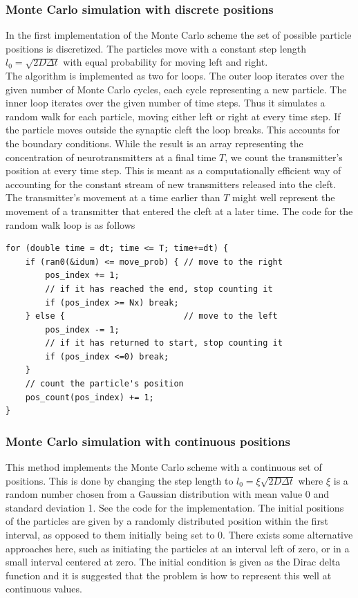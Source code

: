\documentclass[12pt]{article}
\begin{document}
\begin{flushleft}
\subsubsection{Monte Carlo simulation with discrete positions}
In the first implementation of the Monte Carlo scheme the set of possible
particle positions is discretized. The particles move with a
constant step length
$l_0 = \sqrt{2D\Delta t}$ with equal probability for moving left and right.\\
\vspace{5mm}
The algorithm is implemented as two for loops. The outer loop iterates over
the given number of Monte Carlo cycles, each cycle representing a new particle.
The inner loop iterates over the given number of time steps. Thus it simulates
a random walk for each particle, moving either left or right at every time step.
If the particle moves outside the synaptic cleft the loop breaks. This accounts
for the boundary conditions.
While the result is an array representing the concentration of neurotransmitters
at a final time $T$, we count the transmitter's position at every time step.
This is meant as a computationally efficient way of accounting for the constant
stream of new transmitters released into the cleft. The transmitter's movement
at a time earlier than $T$ might well represent the movement of a transmitter
that entered the cleft at a later time. The code for the random walk loop
is as follows
\begin{lstlisting}
for (double time = dt; time <= T; time+=dt) {
    if (ran0(&idum) <= move_prob) { // move to the right
        pos_index += 1;                
        // if it has reached the end, stop counting it
        if (pos_index >= Nx) break;
    } else {                        // move to the left
        pos_index -= 1;
        // if it has returned to start, stop counting it
        if (pos_index <=0) break;
    }
    // count the particle's position
    pos_count(pos_index) += 1;
}
\end{lstlisting}

\subsubsection{Monte Carlo simulation with continuous positions}
This method implements the Monte Carlo scheme with a continuous set of positions.
This is done by changing the step length to $l_0=\xi \sqrt{2D\Delta t}$ where $\xi$
is a random number chosen from a Gaussian distribution with mean value 0 and standard
deviation 1. See the code for the implementation. The initial positions of the particles
are given by a randomly distributed position within the first interval, as opposed to them
initially being set to 0. There exists some alternative approaches here, such as initiating
the particles at an interval left of zero, or in a small interval centered at zero.
The initial condition is given as the Dirac delta function and it is suggested that the problem
is how to represent this well at continuous values.


\end{flushleft}
\end{document}
